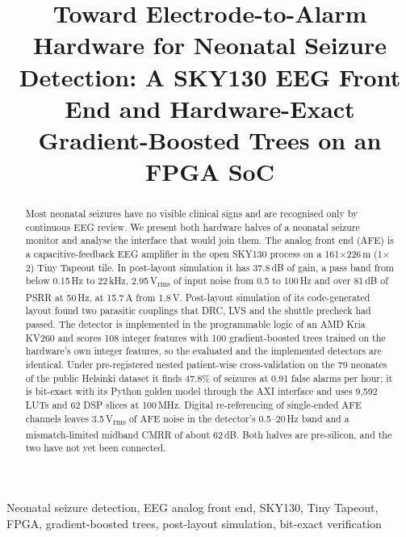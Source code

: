 \documentclass[conference]{IEEEtran}
\newcommand{\uVrms}{\,\textmu V\textsubscript{rms}}
\newcommand{\uA}{\,\textmu A}
\newcommand{\um}{\,\textmu m}
\begin{document}

\title{Toward Electrode-to-Alarm Hardware for Neonatal Seizure Detection: A SKY130 EEG Front End and Hardware-Exact Gradient-Boosted Trees on an FPGA SoC}

\author{
}

\maketitle

\begin{abstract}
Most neonatal seizures have no visible clinical signs and are recognised only by continuous EEG review. We present both hardware halves of a neonatal seizure monitor and analyse the interface that would join them. The analog front end (AFE) is a capacitive-feedback EEG amplifier in the open SKY130 process on a 161$\times$226\um{} (1$\times$2) Tiny Tapeout tile. In post-layout simulation it has 37.8\,dB of gain, a pass band from below 0.15\,Hz to 22\,kHz, 2.95\uVrms{} of input noise from 0.5 to 100\,Hz and over 81\,dB of PSRR at 50\,Hz, at 15.7\uA{} from 1.8\,V. Post-layout simulation of its code-generated layout found two parasitic couplings that DRC, LVS and the shuttle precheck had passed. The detector is implemented in the programmable logic of an AMD Kria KV260 and scores 108 integer features with 100 gradient-boosted trees trained on the hardware's own integer features, so the evaluated and the implemented detectors are identical. Under pre-registered nested patient-wise cross-validation on the 79 neonates of the public Helsinki dataset it finds 47.8\% of seizures at 0.91 false alarms per hour; it is bit-exact with its Python golden model through the AXI interface and uses 9,592 LUTs and 62 DSP slices at 100\,MHz. Digital re-referencing of single-ended AFE channels leaves 3.5\uVrms{} of AFE noise in the detector's 0.5--20\,Hz band and a mismatch-limited midband CMRR of about 62\,dB. Both halves are pre-silicon, and the two have not yet been connected.
\end{abstract}

\begin{IEEEkeywords}
Neonatal seizure detection, EEG analog front end, SKY130, Tiny Tapeout, FPGA, gradient-boosted trees, post-layout simulation, bit-exact verification
\end{IEEEkeywords}
\end{document}
